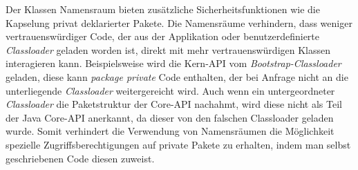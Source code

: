 \bigbreak
Der Klassen Namensraum bieten zusätzliche Sicherheitsfunktionen wie die Kapselung privat deklarierter Pakete. Die Namensräume verhindern, dass weniger vertrauenswürdiger Code, der aus der Applikation oder benutzerdefinierte \textit{Classloader} geladen worden ist, direkt mit mehr vertrauenswürdigen Klassen interagieren kann. Beispielsweise wird die Kern-API vom \textit{Bootstrap-Classloader} geladen, diese kann \textit{package private} Code enthalten, der bei Anfrage nicht an die unterliegende \textit{Classloader} weitergereicht wird. \newline
Auch wenn ein untergeordneter \textit{Classloader} die Paketstruktur der Core-API nachahmt, wird diese nicht als Teil der Java Core-API anerkannt, da dieser von den falschen Classloader geladen wurde. Somit verhindert die Verwendung von Namensräumen die Möglichkeit spezielle Zugriffsberechtigungen auf private Pakete zu erhalten, indem man selbst geschriebenen Code diesen zuweist.

